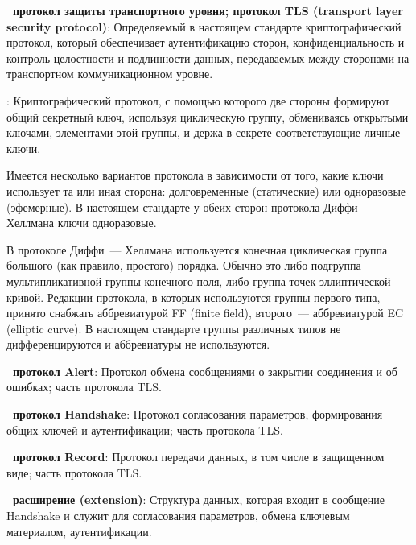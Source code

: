 {\bf \thedefctr~протокол защиты транспортного уровня; протокол TLS 
(transport layer security protocol)}: 
Определяемый в настоящем стандарте криптографический протокол, который
обеспечивает аутентификацию сторон, конфиденциальность и контроль целостности и
подлинности данных, передаваемых между сторонами на транспортном
коммуникационном уровне.

:
Криптографический протокол, с помощью которого две стороны формируют 
общий секретный ключ, используя циклическую группу, обмениваясь открытыми 
ключами, элементами этой группы, и держа в секрете соответствующие личные 
ключи. 

\begin{note}
Имеется несколько вариантов протокола в зависимости от того, какие ключи 
использует та или иная сторона: долговременные (статические) или 
одноразовые (эфемерные). В настоящем стандарте у обеих сторон протокола 
Диффи~--- Хеллмана ключи одноразовые.
\end{note}

\begin{note}
В протоколе Диффи~--- Хеллмана используется конечная циклическая группа большого
(как правило, простого) порядка. Обычно это либо подгруппа мультипликативной
группы конечного поля, либо группа точек эллиптической кривой.
%
Редакции протокола, в которых используются группы первого типа, принято снабжать
аббревиатурой FF (finite field), второго~--- аббревиатурой EC (elliptic curve).
%
В настоящем стандарте группы различных типов не дифференцируются и аббревиатуры 
не используются.
\end{note}

{\bf \thedefctr~протокол Alert}:
Протокол обмена сообщениями о закрытии соединения и об ошибках;
часть протокола TLS.

{\bf \thedefctr~протокол Handshake}:
Протокол согласования параметров, формирования общих ключей и аутентификации; 
часть протокола TLS. 


{\bf \thedefctr~протокол Record}:
Протокол передачи данных, в том числе в защищенном виде; 
часть протокола TLS. 

{\bf \thedefctr~расширение (extension)}:
Структура данных, которая входит в сообщение Handshake и служит для 
согласования параметров, обмена ключевым материалом, аутентификации.

